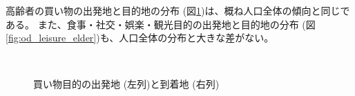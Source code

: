 \documentclass[a4paper,12pt, uplatex]{jsbook}
\begin{document}
高齢者の買い物の出発地と目的地の分布 (図\ref{fig:od_shopping_elder})は、概ね人口全体の傾向と同じである。
また、食事・社交・娯楽・観光目的の出発地と目的地の分布 (図\ref{fig:od_leisure_elder})も、人口全体の分布と大きな差がない。
%
\begin{figure}[htbp]
  \centering
  \\%
    \caption{買い物目的の出発地 (左列)と到着地 (右列)}
  	\label{fig:od_shopping_elder}
\end{figure}
%
\end{document}
